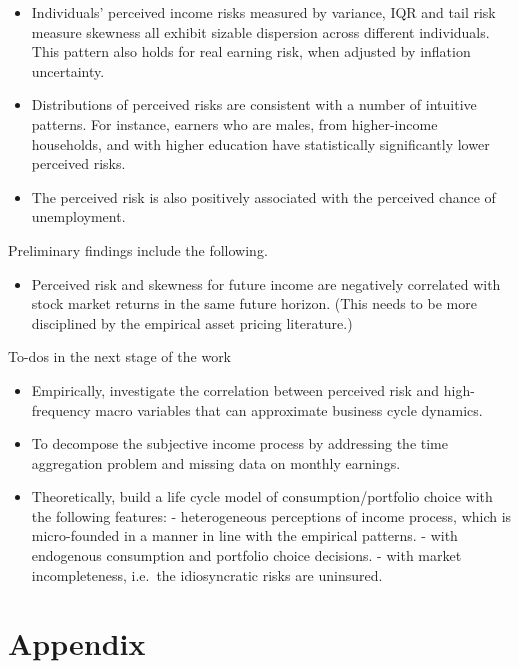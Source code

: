 \documentclass[12pt,notitlepage,onecolumn,aps,pra]{article}
\providecommand{\tightlist}{%
      \setlength{\itemsep}{0pt}\setlength{\parskip}{0pt}}
\begin{document}
\begin{itemize}
\tightlist
\item
  Individuals' perceived income risks measured by variance, IQR and tail
  risk measure skewness all exhibit sizable dispersion across different
  individuals. This pattern also holds for real earning risk, when
  adjusted by inflation uncertainty.
\item
  Distributions of perceived risks are consistent with a number of
  intuitive patterns. For instance, earners who are males, from
  higher-income households, and with higher education have statistically
  significantly lower perceived risks.
\item
  The perceived risk is also positively associated with the perceived
  chance of unemployment.
\end{itemize}

Preliminary findings include the following.

\begin{itemize}
\tightlist
\item
  Perceived risk and skewness for future income are negatively
  correlated with stock market returns in the same future horizon. (This
  needs to be more disciplined by the empirical asset pricing
  literature.)
\end{itemize}

To-dos in the next stage of the work

\begin{itemize}
\item
  Empirically, investigate the correlation between perceived risk and
  high-frequency macro variables that can approximate business cycle
  dynamics.
\item
  To decompose the subjective income process by addressing the time
  aggregation problem and missing data on monthly earnings.
\item
  Theoretically, build a life cycle model of consumption/portfolio
  choice with the following features: - heterogeneous perceptions of
  income process, which is micro-founded in a manner in line with the
  empirical patterns. - with endogenous consumption and portfolio choice
  decisions. - with market incompleteness, i.e.~the idiosyncratic risks
  are uninsured.
\end{itemize}

    \hypertarget{appendix}{%
\section{Appendix}\label{appendix}}
\end{document}
